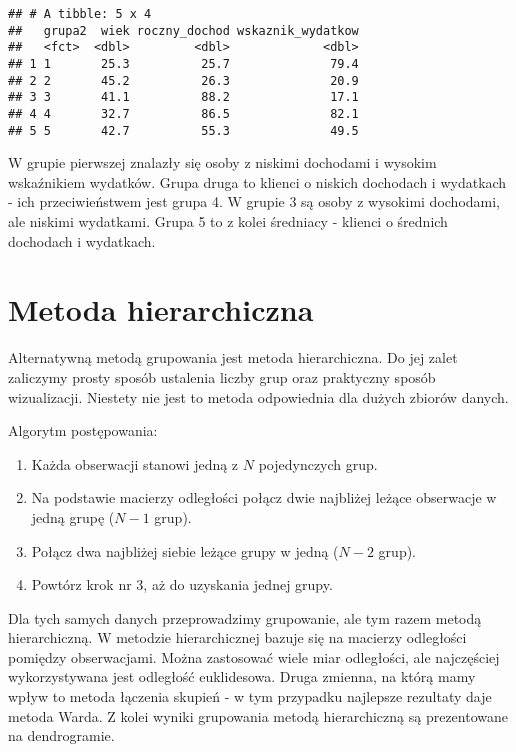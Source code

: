 \documentclass[]{book}
\providecommand{\tightlist}{%
  \setlength{\itemsep}{0pt}\setlength{\parskip}{0pt}}
\begin{document}
\begin{verbatim}
## # A tibble: 5 x 4
##   grupa2  wiek roczny_dochod wskaznik_wydatkow
##   <fct>  <dbl>         <dbl>             <dbl>
## 1 1       25.3          25.7              79.4
## 2 2       45.2          26.3              20.9
## 3 3       41.1          88.2              17.1
## 4 4       32.7          86.5              82.1
## 5 5       42.7          55.3              49.5
\end{verbatim}

W grupie pierwszej znalazły się osoby z niskimi dochodami i wysokim
wskaźnikiem wydatków. Grupa druga to klienci o niskich dochodach i
wydatkach - ich przeciwieństwem jest grupa 4. W grupie 3 są osoby z
wysokimi dochodami, ale niskimi wydatkami. Grupa 5 to z kolei średniacy
- klienci o średnich dochodach i wydatkach.

\section{Metoda hierarchiczna}\label{metoda-hierarchiczna}

Alternatywną metodą grupowania jest metoda hierarchiczna. Do jej zalet
zaliczymy prosty sposób ustalenia liczby grup oraz praktyczny sposób
wizualizacji. Niestety nie jest to metoda odpowiednia dla dużych zbiorów
danych.

Algorytm postępowania:

\begin{enumerate}
\def\labelenumi{\arabic{enumi}.}
\tightlist
\item
  Każda obserwacji stanowi jedną z \(N\) pojedynczych grup.
\item
  Na podstawie macierzy odległości połącz dwie najbliżej leżące
  obserwacje w jedną grupę (\(N-1\) grup).
\item
  Połącz dwa najbliżej siebie leżące grupy w jedną (\(N-2\) grup).
\item
  Powtórz krok nr 3, aż do uzyskania jednej grupy.
\end{enumerate}

Dla tych samych danych przeprowadzimy grupowanie, ale tym razem metodą
hierarchiczną. W metodzie hierarchicznej bazuje się na macierzy
odległości pomiędzy obserwacjami. Można zastosować wiele miar
odległości, ale najczęściej wykorzystywana jest odległość euklidesowa.
Druga zmienna, na którą mamy wpływ to metoda łączenia skupień - w tym
przypadku najlepsze rezultaty daje metoda Warda. Z kolei wyniki
grupowania metodą hierarchiczną są prezentowane na dendrogramie.
\end{document}
